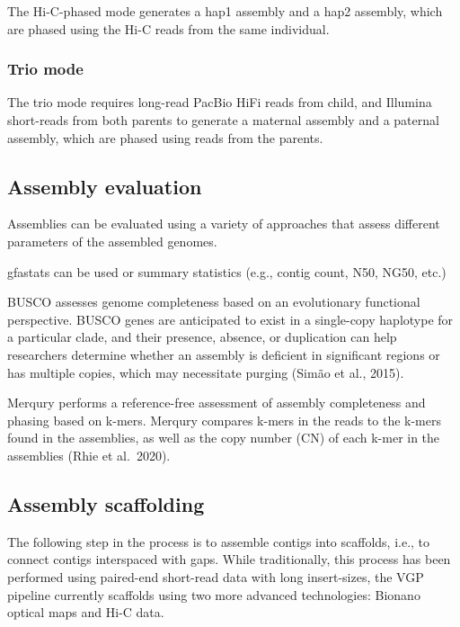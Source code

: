 \documentclass[
]{book}
\begin{document}
The Hi-C-phased mode generates a hap1 assembly and a hap2 assembly, which are phased using the Hi-C reads from the same individual.

\hypertarget{host-genome-assembly-hifiasm-trio}{%
\subsubsection*{Trio mode}\label{host-genome-assembly-hifiasm-trio}}

The trio mode requires long-read PacBio HiFi reads from child, and Illumina short-reads from both parents to generate a maternal assembly and a paternal assembly, which are phased using reads from the parents.

\hypertarget{host-genome-assembly-evaluation}{%
\subsection{Assembly evaluation}\label{host-genome-assembly-evaluation}}

Assemblies can be evaluated using a variety of approaches that assess different parameters of the assembled genomes.

gfastats can be used or summary statistics (e.g., contig count, N50, NG50, etc.)

BUSCO assesses genome completeness based on an evolutionary functional perspective. BUSCO genes are anticipated to exist in a single-copy haplotype for a particular clade, and their presence, absence, or duplication can help researchers determine whether an assembly is deficient in significant regions or has multiple copies, which may necessitate purging (Simão et al., 2015).

Merqury performs a reference-free assessment of assembly completeness and phasing based on k-mers. Merqury compares k-mers in the reads to the k-mers found in the assemblies, as well as the copy number (CN) of each k-mer in the assemblies (Rhie et al.~2020).

\hypertarget{host-genome-scaffolding}{%
\subsection{Assembly scaffolding}\label{host-genome-scaffolding}}

The following step in the process is to assemble contigs into scaffolds, i.e., to connect contigs interspaced with gaps. While traditionally, this process has been performed using paired-end short-read data with long insert-sizes, the VGP pipeline currently scaffolds using two more advanced technologies: Bionano optical maps and Hi-C data.
\end{document}

